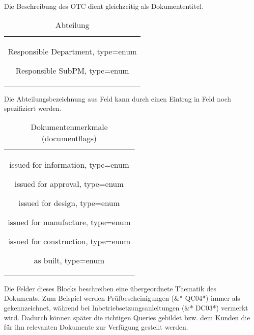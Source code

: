 Die Beschreibung des OTC dient gleichzeitig als Dokumententitel.
\\
\newpage
%
\begin{table}[H]
  \centering
  \begin{tabular}{c}
  \parbox{10cm}{
   \begin{compactitem}
 \item Responsible Department, type=enum
	\item Responsible SubPM, type=enum
\end{compactitem}}
  \end{tabular}
  \label{tab:fifth}
  \caption{Abteilung}
\end{table}
%
Die Abteilungsbezeichnung aus Feld  kann durch einen Eintrag in Feld  noch spezifiziert werden.
\\
%
\begin{table}[H]
  \centering
  \begin{tabular}{c}
  \parbox{10cm}{
    \begin{compactitem}
  \item issued for information, type=enum
    \item issued for approval, type=enum
    \item issued for design, type=enum
    \item issued for manufacture, type=enum
    \item issued for construction, type=enum
    \item as built, type=enum
\end{compactitem}}
  \end{tabular}
  \label{tab:sixth}
  \caption{Dokumentenmerkmale (documentflags)}
\end{table}
%
Die Felder dieses Blocks beschreiben eine übergeordnete Thematik des Dokuments. Zum Beispiel werden Prüfbescheinigungen (\&* QC04*) immer als  gekennzeichnet, während bei Inbetriebsetzungsanleitungen (\&* DC03*)  vermerkt wird. Dadurch können später die richtigen Queries gebildet bzw. dem Kunden die für ihn relevanten Dokumente zur Verfügung gestellt werden.
\\ 
%
